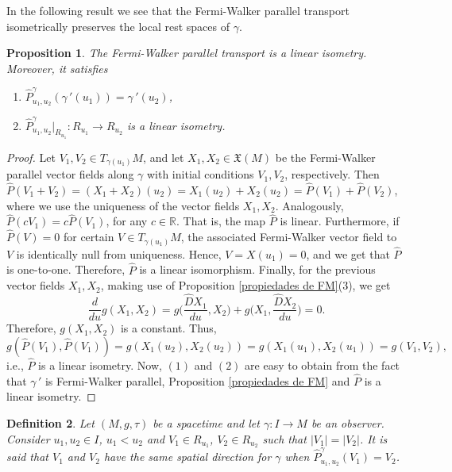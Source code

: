 \documentclass[11pt]{book}
\newtheorem{defi}{Definition}[chapter]
\newtheorem{pro}[defi]{Proposition}
\def\R{\mathbb R}
\def\x{\mathfrak X}
\begin{document}
In the following result we see that the Fermi-Walker parallel transport isometrically preserves the local rest spaces of $\gamma$.
\begin{pro}
	The Fermi-Walker parallel transport is a linear isometry. Moreover, it satisfies
	\begin{enumerate}
		\item[(1)] $\widehat{P}_{u_1,u_2}^\gamma(\gamma{\,'}(u_1))=\gamma{\,'}(u_2)$,
		\item[(2)] $\widehat{P}_{u_1,u_2}^\gamma|_{R_{u_1}} :R_{u_1}\to R_{u_2}$ is a linear isometry.
	\end{enumerate}
\end{pro}
\begin{proof}
	Let $V_1,V_2\in T_{\gamma(u_1)}M$, and let $X_1,X_2\in \x(M)$ be the Fermi-Walker parallel vector fields along $\gamma$ with initial conditions $V_1,V_2$, respectively.
	Then $\widehat{P}(V_1+V_2)=(X_1+X_2)(u_2)=X_1(u_2)+X_2(u_2)=\widehat{P}(V_1)+\widehat{P}(V_2)$, where we use the uniqueness of the vector fields $X_1,X_2$. Analogously, $\widehat{P}(cV_1)=c\widehat{P}(V_1)$, for any $c\in \R$. That is, the map $\widehat{P}$ is linear. 
	Furthermore, if $\widehat{P}(V)=0$ for certain $V\in T_{\gamma(u_1)}M$, the associated Fermi-Walker vector field to $V$ is identically null from uniqueness. Hence, $V=X(u_1)=0$, and we get that $\widehat{P}$ is one-to-one. Therefore, $\widehat{P}$ is a linear isomorphism. Finally, for the previous vector fields $X_1,X_2$, making use of Proposition \ref{propiedades de FM}(3), we get
	\[
	\frac{d}{du} g(X_1,X_2)=g\Big(\frac{\widehat{D}X_1}{du}, X_2\Big) + g\Big(X_1,\frac{\widehat{D}X_2}{du}\Big)=0.
	\]
	Therefore, $g(X_1,X_2)$ is a constant. Thus,
	\[
	g(\widehat{P}(V_1),\widehat{P}(V_1))=g(X_1(u_2),X_2(u_2))=g(X_1(u_1),X_2(u_1))=g(V_1,V_2),
	\]
	i.e., $\widehat{P}$ is a linear isometry.
	Now, $(1)$ and $(2)$ are easy to obtain from the fact that $\gamma{\,'}$ is Fermi-Walker parallel, Proposition \ref{propiedades de FM} and $\widehat{P}$ is a linear isometry.  
\end{proof}

\begin{defi}\label{frame field}
	Let $(M,g,\tau)$ be a spacetime and let $\gamma:I\to M$ be an observer. Consider $u_1,u_2\in I$, $u_1<u_2$ and $V_1\in R_{u_1}$, $V_2\in R_{u_2}$ such that $|V_1|=|V_2|$. It is said that $V_1$ and $V_2$ have the same spatial direction for $\gamma$ when $\widehat{P}_{u_1,u_2}^\gamma(V_1)=V_2$. 
\end{defi}	
\end{document}
